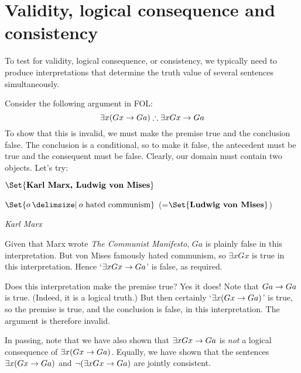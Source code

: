 \section{Validity, logical consequence and consistency}
To test for validity, logical consequence, or consistency, we typically need to produce interpretations that determine the truth value of several sentences simultaneously.

Consider the following argument in FOL:
$$\exists x(Gx \eif Ga) \therefore \exists x Gx \eif Ga$$
To show that this is invalid, we must make the premise true and the conclusion false. The conclusion is a conditional, so to make it false, the antecedent must be true and the consequent must be false. Clearly, our domain must contain two objects. Let's try:
	\begin{interp}
		\item[\domain] $\Set{\text{\emph{Karl Marx, Ludwig von Mises}}}$
		\item[\denote{G}] $\Set{o \given o\text{ hated communism}}$ (=$\Set{\emph{Ludwig von Mises}}$)
		\item[\denote{a}] \emph{Karl Marx}
	\end{interp}
Given that Marx wrote \emph{The Communist Manifesto}, $Ga$ is plainly false in this interpretation. But von Mises famously hated communism, so $\exists x Gx$ is true in this interpretation. Hence `$\exists x Gx \rightarrow Ga$' is false, as required.

Does this interpretation make the premise true? Yes it does! Note that $Ga \rightarrow Ga$ is true. (Indeed, it is a logical truth.) But then certainly `$\exists x (Gx \rightarrow Ga)$' is true, so the premise is true, and the conclusion is false, in this interpretation. The argument is therefore invalid.

In passing, note that we have also shown that $\exists x Gx \rightarrow Ga$ is \emph{not} a logical consequence of $\exists x(Gx \rightarrow Ga)$. Equally, we have shown that the sentences $\exists x (Gx \rightarrow Ga)$ and $\neg (\exists x Gx \rightarrow Ga)$ are jointly consistent.

